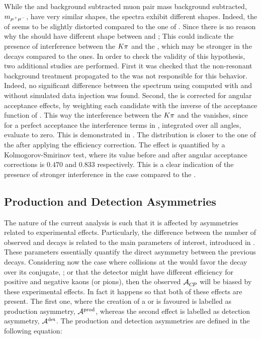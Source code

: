 While the \Bs and \Bd background subtracted muon pair mass background subtracted, $m_{\mu^+\mu^-}$, have very similar shapes, the \mkpi spectra exhibit different shapes.
Indeed, the \Bs \mkpi \sPlot of  seems to be slightly distorted compared to the one of \Bd \mkpi.
Since there is no \aprior reason why the \Kstarz \pwave
should have different shape between \BsJpsiKst and \BdJpsiKst; This could indicate the presence of interference between
the $K\pi$ \swave and the \Kstarz, which may be stronger in the \Bs decays compared to the \Bd ones. In order
to check the validity of this hypothesis, two additional studies are performed. First it was checked that the non-resonant
background treatment propagated to the \sWeights was not responsible for this behavior. Indeed, no significant difference
between the \Bs \mkpi spectrum using \sWeights computed with and without simulated data injection was found. Second, the \mkpi
is corrected for angular acceptance effects, by weighting each candidate with the inverse of the acceptance function of .
This way the interference between the $K\pi$ \swave and the \Kstarz \pwave vanishes, since
for a perfect acceptance the interference terms in , integrated over all angles, evaluate to zero.
This is demonstrated in . The \Bs \mkpi distribution is closer to the one of the \Bd after applying
the efficiency correction. The effect is quantified by a Kolmogorov-Smirinov test, where its value before and after
angular acceptance corrections is $0.470$ and $0.833$ respectively. This is a clear indication of the presence of
stronger interference in the \Bs case compared to the \Bd.

\subsection{Production and Detection Asymmetries}
\label{experimentalAssym}
The nature of the current analysis is such that it is affected by asymmetries related to experimental effects.
Particularly, the difference between the number of observed \BsJpsiKst and \BsbarJpsiKst decays is related to the
main parameters of interest, introduced in . These parameters essentially
quantify the direct \CP asymmetry between the previous decays.
Considering now the case where collisions at the \lhc would favor the \BsJpsiKst decay over its \CP conjugate, \BsbarJpsiKst;
or that the detector might have different efficiency for positive and negative kaons (or pions),
then the observed $\mathcal{A}_{C\!P}^{}$ will be biased by these experimental effects. In fact it happens so that both of these effects
are present. The first one, where the creation of a \Bs or \Bsb is favoured is labelled as  production asymmetry, $\mathcal{A}^{\text{prod}}$,
whereas the second effect is labelled as detection asymmetry, $\mathcal{A}^{\text{det}}$. The production and detection
asymmetries are defined in the following equation:

